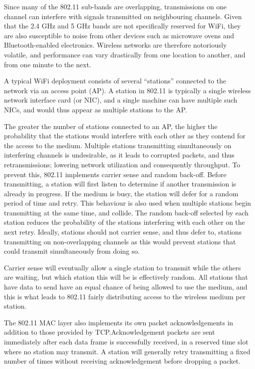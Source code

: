 Since many of the 802.11 sub-bands are overlapping, transmissions on one channel
can interfere with signals transmitted on neighbouring channels. Given that the
2.4 GHz and 5 GHz bands are
not specifically reserved for WiFi, they are also susceptible to noise from
other devices such as microwave ovens and Bluetooth-enabled electronics.
Wireless networks are therefore notoriously volatile, and performance can vary
drastically from one location to another, and from one minute to the next.

A typical WiFi deployment consists of several ``stations'' connected to
the network via an access point (AP). A station in 802.11 is typically a single
wireless network interface card (or NIC), and a single machine can have multiple
such NICs, and would thus appear as multiple stations to the AP.

The greater
the number of stations connected to an AP, the higher the probability that the
stations would interfere with each other as they contend for the access to the
medium. Multiple stations transmitting simultaneously
on interfering channels is undesirable, as it leads to corrupted packets,
and thus retransmissions; lowering network utilization and
consequently throughput.
To prevent this, 802.11 implements carrier sense and random back-off. Before
transmitting, a station will first listen to determine if another transmission is already
in progress. If the medium is busy, the station will defer for a
random period of time and retry. This behaviour is also used when multiple
stations begin transmitting at the same time, and collide. The random back-off
selected by each station reduces the probability of the stations interfering
with each other on the next retry. Ideally, stations should not carrier sense,
and thus defer to, stations transmitting on non-overlapping channels as this would prevent stations
that could transmit simultaneously from doing so.

Carrier sense will eventually allow a single station to transmit while the
others are waiting, but which station this will be is effectively random. All
stations that have data to send have an equal chance of being allowed to use the
medium, and this is what leads to 802.11 fairly distributing access to the
wireless medium per station.

The 802.11 MAC layer also implements its own packet acknowledgements in addition
to those provided by TCP.\@ Acknowledgement packets are sent immediately after
each data frame is successfully received, in a reserved time slot where no station
may transmit. A station will generally retry transmitting a fixed number of times
without receiving acknowledgement before dropping a packet.

